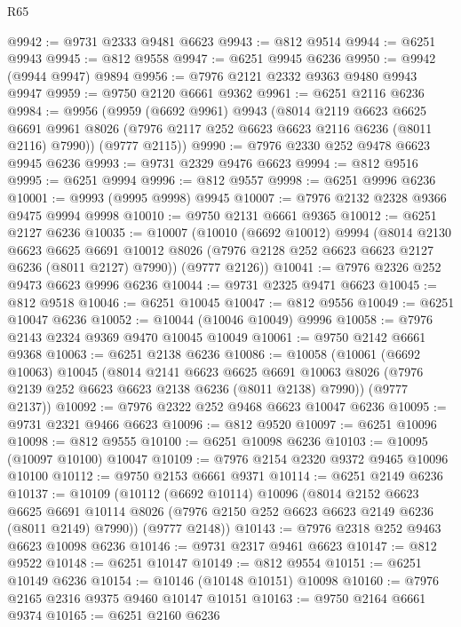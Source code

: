 \begin{lexlean}{R65}
\begin{coremodule}
{@9942 := @9731 @2333 @9481 @6623
@9943 := @812 @9514
@9944 := @6251 @9943
@9945 := @812 @9558
@9947 := @6251 @9945 @6236
@9950 := @9942 (@9944 @9947) @9894
@9956 := @7976 @2121 @2332 @9363 @9480 @9943 @9947
@9959 := @9750 @2120 @6661 @9362
@9961 := @6251 @2116 @6236
@9984 := @9956
    (@9959
      (@6692 @9961)
      @9943
      (@8014
        @2119
        @6623
        @6625
        @6691
        @9961
        @8026
        (@7976 @2117 @252 @6623 @6623 @2116 @6236 (@8011 @2116) @7990))
      (@9777 @2115))
@9990 := @7976 @2330 @252 @9478 @6623 @9945 @6236
@9993 := @9731 @2329 @9476 @6623
@9994 := @812 @9516
@9995 := @6251 @9994
@9996 := @812 @9557
@9998 := @6251 @9996 @6236
@10001 := @9993 (@9995 @9998) @9945
@10007 := @7976 @2132 @2328 @9366 @9475 @9994 @9998
@10010 := @9750 @2131 @6661 @9365
@10012 := @6251 @2127 @6236
@10035 := @10007
    (@10010
      (@6692 @10012)
      @9994
      (@8014
        @2130
        @6623
        @6625
        @6691
        @10012
        @8026
        (@7976 @2128 @252 @6623 @6623 @2127 @6236 (@8011 @2127) @7990))
      (@9777 @2126))
@10041 := @7976 @2326 @252 @9473 @6623 @9996 @6236
@10044 := @9731 @2325 @9471 @6623
@10045 := @812 @9518
@10046 := @6251 @10045
@10047 := @812 @9556
@10049 := @6251 @10047 @6236
@10052 := @10044 (@10046 @10049) @9996
@10058 := @7976 @2143 @2324 @9369 @9470 @10045 @10049
@10061 := @9750 @2142 @6661 @9368
@10063 := @6251 @2138 @6236
@10086 := @10058
    (@10061
      (@6692 @10063)
      @10045
      (@8014
        @2141
        @6623
        @6625
        @6691
        @10063
        @8026
        (@7976 @2139 @252 @6623 @6623 @2138 @6236 (@8011 @2138) @7990))
      (@9777 @2137))
@10092 := @7976 @2322 @252 @9468 @6623 @10047 @6236
@10095 := @9731 @2321 @9466 @6623
@10096 := @812 @9520
@10097 := @6251 @10096
@10098 := @812 @9555
@10100 := @6251 @10098 @6236
@10103 := @10095 (@10097 @10100) @10047
@10109 := @7976 @2154 @2320 @9372 @9465 @10096 @10100
@10112 := @9750 @2153 @6661 @9371
@10114 := @6251 @2149 @6236
@10137 := @10109
    (@10112
      (@6692 @10114)
      @10096
      (@8014
        @2152
        @6623
        @6625
        @6691
        @10114
        @8026
        (@7976 @2150 @252 @6623 @6623 @2149 @6236 (@8011 @2149) @7990))
      (@9777 @2148))
@10143 := @7976 @2318 @252 @9463 @6623 @10098 @6236
@10146 := @9731 @2317 @9461 @6623
@10147 := @812 @9522
@10148 := @6251 @10147
@10149 := @812 @9554
@10151 := @6251 @10149 @6236
@10154 := @10146 (@10148 @10151) @10098
@10160 := @7976 @2165 @2316 @9375 @9460 @10147 @10151
@10163 := @9750 @2164 @6661 @9374
@10165 := @6251 @2160 @6236
}
\end{coremodule}
\end{lexlean}
